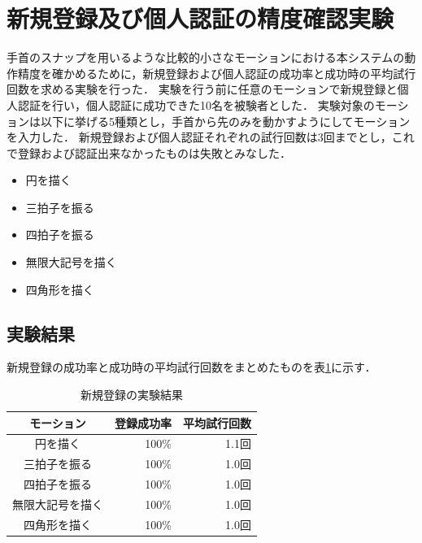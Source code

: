 \documentclass[12pt]{jreport}
\begin{document}
    \section{新規登録及び個人認証の精度確認実験}
    \label{previousExp}
    手首のスナップを用いるような比較的小さなモーションにおける本システムの動作精度を確かめるために，新規登録および個人認証の成功率と成功時の平均試行回数を求める実験を行った．
    実験を行う前に任意のモーションで新規登録と個人認証を行い，個人認証に成功できた10名を被験者とした．
    実験対象のモーションは以下に挙げる5種類とし，手首から先のみを動かすようにしてモーションを入力した．
    新規登録および個人認証それぞれの試行回数は3回までとし，これで登録および認証出来なかったものは失敗とみなした．

    \begin{itemize}
        \item 円を描く
        \item 三拍子を振る
        \item 四拍子を振る
        \item 無限大記号を描く
        \item 四角形を描く
    \end{itemize}

    \subsection{実験結果}
    新規登録の成功率と成功時の平均試行回数をまとめたものを表\ref{regResult}に示す．

    \begin{table}[htb]
        \begin{center}
            \caption{新規登録の実験結果}
            \label{regResult}
            \begin{tabular}{|c|r|r|} \hline
                モーション & 登録成功率 & 平均試行回数 \\ \hline \hline
                円を描く & 100\% & 1.1回 \\ \hline
                三拍子を振る & 100\% & 1.0回 \\ \hline
                四拍子を振る & 100\% & 1.0回 \\ \hline
                無限大記号を描く & 100\% & 1.0回 \\ \hline
                四角形を描く & 100\% & 1.0回 \\ \hline
            \end{tabular}
        \end{center}
    \end{table}
\end{document}
